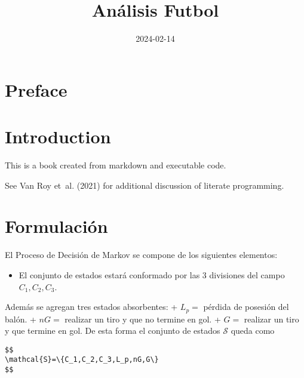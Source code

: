 \documentclass[
  us-letterpaper,
  DIV=11,
  numbers=noendperiod]{scrreprt}
\title{Análisis Futbol}
\author{}
\date{2024-02-14}
\providecommand{\tightlist}{%
  \setlength{\itemsep}{0pt}\setlength{\parskip}{0pt}}\usepackage{longtable,booktabs,array}
\renewcommand*\contentsname{Tabla de contenidos}
\newcommand\contentsname{Tabla de contenidos}
\begin{document}
\maketitle

\renewcommand*\contentsname{Tabla de contenidos}
{
\hypersetup{linkcolor=}
\setcounter{tocdepth}{2}
\tableofcontents
}


\chapter*{Preface}\label{preface}



\chapter{Introduction}\label{introduction}

This is a book created from markdown and executable code.

See Van Roy et~al. (2021) for additional discussion of literate
programming.


\chapter{Formulación}\label{formulaciuxf3n}

El Proceso de Decisión de Markov se compone de los siguientes elementos:

\begin{itemize}
\tightlist
\item
  El conjunto de estados estará conformado por las 3 divisiones del
  campo \(C_1,C_2,C_3\).
\end{itemize}

Además se agregan tres estados absorbentes: + \(L_p =\) pérdida de
posesión del balón. + \(nG =\) realizar un tiro y que no termine en gol.
+ \(G =\) realizar un tiro y que termine en gol. De esta forma el
conjunto de estados \(\mathcal{S}\) queda como

\begin{verbatim}
$$
\mathcal{S}=\{C_1,C_2,C_3,L_p,nG,G\}
$$
\end{verbatim}
\end{document}
